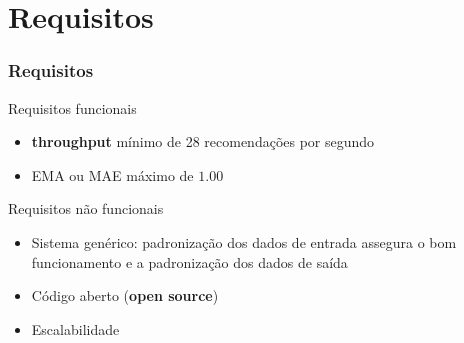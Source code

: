 \section[Requisitos]{Requisitos}
\begin{frame}
\frametitle{Requisitos}
\begin{block}{Requisitos funcionais}
\begin{itemize}
	\item \textbf{throughput} mínimo de 28 recomendações por segundo
	\item EMA ou MAE máximo de $1.00$  
\end{itemize}
\end{block}

\begin{block}{Requisitos não funcionais}
\begin{itemize}
	\item Sistema genérico: padronização dos dados de entrada assegura o bom funcionamento e a padronização dos dados de saída
	\item Código aberto (\textbf{open source})
	\item Escalabilidade
\end{itemize}
\end{block}
\end{frame}
